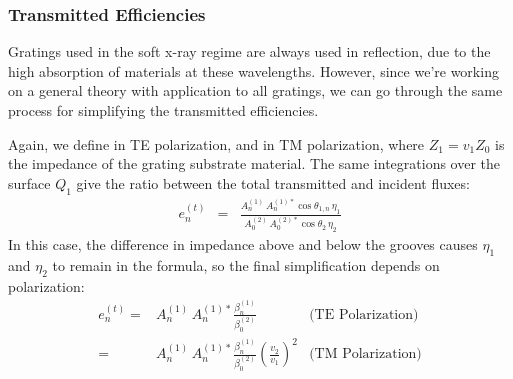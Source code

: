 \subsubsection{Transmitted Efficiencies}
Gratings used in the soft x-ray regime are always used in reflection, due to the high absorption of materials at these wavelengths.  However, since we're working on a general theory with application to all gratings, we can go through the same process for simplifying the transmitted efficiencies.  

Again, we define  in TE polarization, and  in TM polarization, where $Z_1 = v_1 Z_0$ is the impedance of the grating substrate material.  The same integrations over the surface $Q_1$ give the ratio between the total transmitted and incident fluxes:
\begin{eqnarray}
e_n^{(t)} &=& \frac{    A_n^{(1)} \, A_n^{(1)\ast} \cos \theta_{1,n} \, \eta_1       }{    A_0^{(2)} \, A_0^{(2)\ast}  \cos \theta_{2} \,  \eta_2   }
\end{eqnarray}
In this case, the difference in impedance above and below the grooves causes $\eta_1$ and $\eta_2$ to remain in the formula, so the final simplification depends on polarization:
\begin{eqnarray}
e_n^{(t)} =& A_n^{(1)} \, A_n^{(1)\ast} \frac{  \beta_n^{(1)}   } {  \beta_0^{(2)} }  & \textrm{(TE Polarization)} \\
=& A_n^{(1)} \, A_n^{(1)\ast} \frac{  \beta_n^{(1)}   } {  \beta_0^{(2)} }  \left( \frac{v_2}{v_1} \right)^2 & \textrm{(TM Polarization)}
\end{eqnarray}


